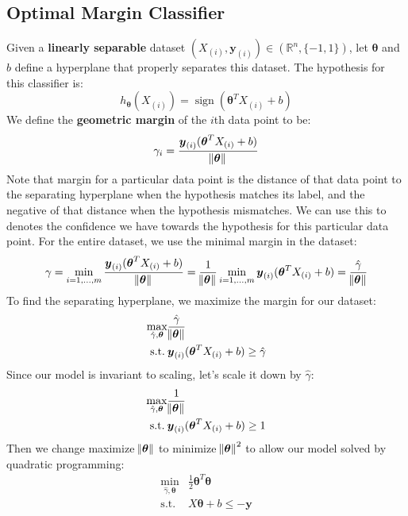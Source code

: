 \documentclass{article}
\renewcommand{\pmb}[1]{\boldsymbol{#1}}
\DeclareMathOperator{\sign}{sign}
\begin{document}
\subsection{Optimal Margin Classifier}
Given a \textbf{linearly separable} dataset $(X_{(i)}, \pmb y_{(i)}) \in (\mathbb{R}^n, \{-1, 1\})$, let $\pmb\theta$ and $b$ define a hyperplane that properly separates this dataset. The hypothesis for this classifier is: 
$$h_{\pmb\theta} (X_{(i)}) = \sign (\pmb\theta^T X_{(i)} + b)$$
We define the \textbf{geometric margin} of the $i$th data point to be:
$$\gamma_{i} = \frac{\pmb{y}_{(i)} (\pmb\theta^T X_{(i)} + b) }{\norm{\pmb\theta}}$$
Note that margin for a particular data point is the distance of that data point to the separating hyperplane when the hypothesis matches its label, and the negative of that distance when the hypothesis mismatches. We can use this to denotes the confidence we have towards the hypothesis for this particular data point. For the entire dataset, we use the minimal margin in the dataset:
$$\gamma = \min_{i=1,\dots,m} \frac{\pmb{y}_{(i)} (\pmb\theta^T X_{(i)} + b)}{\norm{\pmb\theta}} = \frac{1}{\norm{\pmb\theta}} \min_{i=1,\dots,m} \pmb{y}_{(i)} (\pmb\theta^T X_{(i)} + b) = \frac{\hat\gamma}{\norm{\pmb\theta}} $$
To find the separating hyperplane, we maximize the margin for our dataset:
\begin{align*}
	\max_{\hat\gamma, \pmb\theta} &\frac{\hat{\gamma}}{\norm{\pmb\theta}} \\
	\text{s.t.}\: &\pmb{y}_{(i)} (\pmb\theta^T X_{(i)} + b) \geq \hat{\gamma}
\end{align*}
Since our model is invariant to scaling, let's scale it down by $\hat\gamma$:
\begin{align*}
\max_{\hat\gamma, \pmb\theta} &\frac{1}{\norm{\pmb\theta}} \\
\text{s.t.}\: &\pmb{y}_{(i)} (\pmb\theta^T X_{(i)} + b) \geq 1
\end{align*}
Then we change maximize $\norm{\pmb\theta}$ to minimize $\norm{\pmb\theta}^2$ to allow our model solved by quadratic programming:
\begin{align*}
\min_{\hat\gamma, \pmb\theta} &\frac{1}{2} \pmb\theta^T \pmb\theta \\
\text{s.t.}\: &X\pmb\theta + b \leq -\pmb y 
\end{align*}
\end{document}
